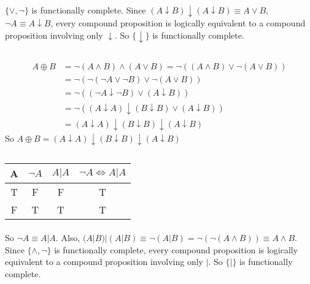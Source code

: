 \documentclass[a4paper,12pt,titlepage]{article}
\begin{document}
\subsection{}
\paragraph{}$\lbrace\vee,\neg\rbrace$ is functionally complete. Since $(A\downarrow B)\downarrow(A\downarrow B)\equiv A\vee  B$, $\neg A\equiv A\downarrow B$, every compound proposition is logically equivalent to a compound proposition involving only $\downarrow$. So $\lbrace\downarrow\rbrace$ is functionally complete.


\subsection{}
\begin{align*}
A\oplus B&=\neg (A\wedge B)\wedge (A\vee B)=\neg((A\wedge B)\vee \neg(A\vee B))\\
&=\neg(\neg(\neg A\vee \neg B)\vee \neg(A\vee B))\\
&=\neg((\neg A\downarrow \neg B)\vee (A\downarrow B))\\
&=\neg((A\downarrow A)\downarrow (B\downarrow B)\vee (A\downarrow B))\\
&=(A\downarrow A)\downarrow (B\downarrow B)\downarrow (A\downarrow B)
\end{align*}
So $A\oplus B=(A\downarrow A)\downarrow (B\downarrow B)\downarrow (A\downarrow B)$

\subsection{}
\begin{table}[H]
  \centering
\begin{tabular}{|c|c|c|c|}
\hline
\hline
A & $\neg A$ & $A|A$ & $\neg A\Leftrightarrow A| A$ \\
\hline
T & F & F & T\\
\hline
F & T & T & T\\
\hline
\hline
\end{tabular}
\end{table}
\paragraph{}So $\neg A\equiv A| A$. Also, $(A| B)|(A| B)\equiv \neg(A|B)=\neg(\neg(A\wedge B))\equiv A\wedge B$. Since $\lbrace\wedge,\neg\rbrace$ is functionally complete, every compound proposition is logically equivalent to a compound proposition involving only $|$. So $\lbrace|\rbrace$ is functionally complete.
\end{document}
